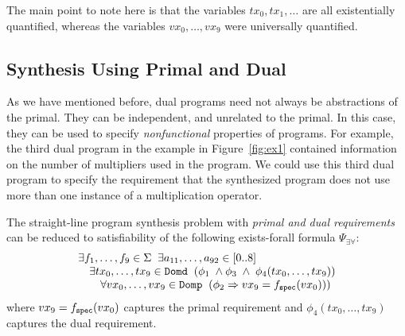 \documentclass[preprint]{sig-alternate-05-2015}
\newcommand\ignore[1]{{}}
\def\domp{{\tt{Domp}}}
\def\domd{{\tt{Domd}}}
\def\spec{{\tt{spec}}}
\def\Sig{{\Sigma}}
\def\ite{{\texttt{if-then-else}}}
\begin{document}
The main point to note here is that the variables
$tx_0,tx_1,\ldots$ are all existentially quantified,
whereas the variables $vx_0, \ldots, vx_9$ were universally quantified.

\ignore{

If we also allow $\ite$ statements in programs, then the
translation into $\exists\forall$ is slightly more
complicated.   The key point to note here is that
loop-free programs with $\ite$ can be written
as straight-line programs with $\Phi$ (Phi) functions.
So, synthesis of loop-free programs can be performed
by synthesizing straight-line programs, but allowing the
use of $\Phi$ functions in the straight-line code.
It is easy to see that the dual semantics of $\ite$
can be adapted to define semantics of an assignment
statement that contains a $\Phi$ function on the right-hand
side.

\endignore}

\subsection{Synthesis Using Primal and Dual}

As we have mentioned before, dual programs need not always be
abstractions of the primal. They can be independent, and unrelated
to the primal. In this case, they can be used to specify
{\em{nonfunctional}} properties of programs.
For example, the third dual program in the example in Figure~\ref{fig:ex1}
contained information on the number of multipliers used in the program.
We could use this third dual program to specify the requirement
that the synthesized program does not use more than
one instance of a multiplication operator.

The straight-line program synthesis problem with
{\em{primal and dual requirements}} can be reduced to
satisfiability of
the following exists-forall formula $\Psi_{\exists\forall}$:
\[
  \begin{array}{l}
  \exists{f_1,\ldots,f_9}\in\Sig\;\;
  \exists{a_{11},\ldots,a_{92}}\in [0..8]\;\;
  \\ \quad
  \exists{tx_0,\ldots,tx_9}\in\domd\;\;
  (\phi_1 \; \wedge
  \phi_3 \;\wedge\; \phi_4(tx_0,\ldots,tx_9))
  \\ \qquad
  \forall{vx_0,\ldots,vx_9}\in\domp\;\;(\phi_2 \Rightarrow vx_9 = f_\spec(vx_0)))
\end{array}
\]
where $vx_9 = f_\spec(vx_0)$ captures the primal requirement and
$\phi_4(tx_0,\ldots,tx_9)$ captures the dual requirement.
\end{document}
